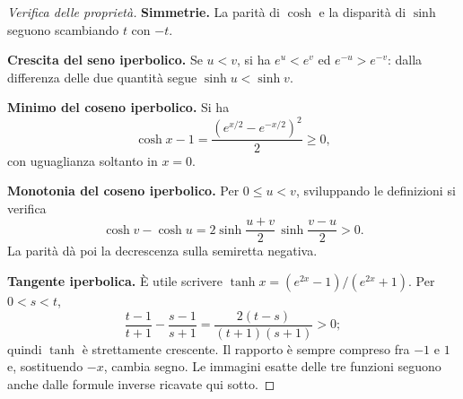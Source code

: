 \begin{schema}
\hspace{1.3cm}
\end{schema}

\begin{proof}[Verifica delle proprietà]
\textbf{Simmetrie.} La parità di $\cosh$ e la disparità di $\sinh$ seguono scambiando $t$ con $-t$.

\textbf{Crescita del seno iperbolico.} Se $u<v$, si ha $e^u<e^v$ ed $e^{-u}>e^{-v}$: dalla differenza delle due quantità segue $\sinh u<\sinh v$.

\textbf{Minimo del coseno iperbolico.} Si ha
\[
\cosh x-1=\frac{(e^{x/2}-e^{-x/2})^2}{2}\ge0,
\]
con uguaglianza soltanto in $x=0$.

\textbf{Monotonia del coseno iperbolico.} Per $0\le u<v$, sviluppando le definizioni si verifica
\[
\cosh v-\cosh u
=2\sinh\frac{u+v}2\,\sinh\frac{v-u}2>0.
\]
La parità dà poi la decrescenza sulla semiretta negativa.

\textbf{Tangente iperbolica.} È utile scrivere $\tanh x=(e^{2x}-1)/(e^{2x}+1)$. Per $0<s<t$,
\[
\frac{t-1}{t+1}-\frac{s-1}{s+1}
=\frac{2(t-s)}{(t+1)(s+1)}>0;
\]
quindi $\tanh$ è strettamente crescente. Il rapporto è sempre compreso fra $-1$ e $1$ e, sostituendo $-x$, cambia segno. Le immagini esatte delle tre funzioni seguono anche dalle formule inverse ricavate qui sotto.
\end{proof}

